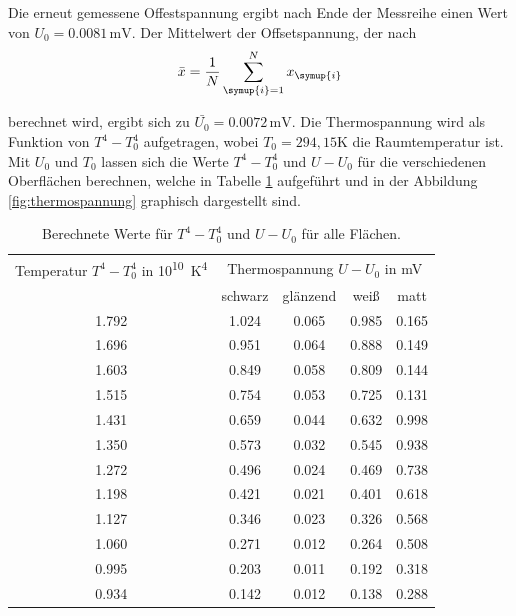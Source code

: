Die erneut gemessene Offestspannung ergibt nach Ende der Messreihe einen Wert von
$U_0=0.0081 \,\si{\milli\volt}$. Der Mittelwert der Offsetspannung, der nach
\begin{equation}
  \bar{x} = \frac{1}{N} \sum_{\symup{i}=1}^{N} x_\symup{i}
  \label{eqn:mittelwert}
\end{equation}

berechnet wird, ergibt sich zu $\bar{U_0} = 0.0072 \,\si{\milli\volt}$.
Die Thermospannung wird als Funktion von $T^4 - T_0^4$ aufgetragen, wobei $T_0 = 294,15 \si{\kelvin}$
die Raumtemperatur ist.
Mit $U_0$ und $T_0$ lassen sich die Werte $T^4-T_0^4$ und $U-U_0$ für die verschiedenen
Oberflächen berechnen, welche in Tabelle \ref{tab:rechenwerte} aufgeführt und in
der Abbildung \ref{fig:thermospannung} graphisch dargestellt sind.
\begin{table}
  \centering
  \begin{tabular}{c c c c c}
    \toprule
    Temperatur $T^4-T_0^4$ in \si{10^{10}\kelvin^4} & \multicolumn {4}{c}{Thermospannung $U-U_0$ in \si{\milli\volt}}\\
    & schwarz & glänzend & \;weiß & \quad matt \\
    \midrule
     1.792  &  1.024  &  0.065  &  0.985  &  0.165 \\
     1.696  &  0.951  &  0.064  &  0.888  &  0.149 \\
     1.603  &  0.849  &  0.058  &  0.809  &  0.144 \\
     1.515  &  0.754  &  0.053  &  0.725  &  0.131 \\
     1.431  &  0.659  &  0.044  &  0.632  &  0.998 \\
     1.350  &  0.573  &  0.032  &  0.545  &  0.938 \\
     1.272  &  0.496  &  0.024  &  0.469  &  0.738 \\
     1.198  &  0.421  &  0.021  &  0.401  &  0.618 \\
     1.127  &  0.346  &  0.023  &  0.326  &  0.568 \\
     1.060  &  0.271  &  0.012  &  0.264  &  0.508 \\
     0.995  &  0.203  &  0.011  &  0.192  &  0.318 \\
     0.934  &  0.142  &  0.012  &  0.138  &  0.288 \\
    \bottomrule
  \end{tabular}
  \caption{Berechnete Werte für $T^4-T_0^4$ und $U-U_0$ für alle Flächen.}
  \label{tab:rechenwerte}
\end{table}
